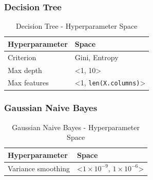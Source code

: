 \subsubsection{Decision Tree}

\begin{table}[H]
    \small
    \setlength{\tabcolsep}{8pt}
    \renewcommand{\arraystretch}{1.3}
    \centering
        \caption[Decision Tree - Hyperparameter Space]{Decision Tree - Hyperparameter Space}\label{tab:dtspace}
        \begin{tabular}{ll}
    \toprule
    \textbf{Hyperparameter} & \textbf{Space}\\
    \midrule
    \hline
    Criterion & Gini, Entropy \\
    Max depth & <1, 10> \\
    Max features & <1, \verb|len(X.columns)|>  \\
    \hline
    \bottomrule
    \end{tabular}
    \vspace{0.7em}

    \vspace{-1em}
\end{table}

\subsubsection{Gaussian Naive Bayes}

\begin{table}[H]
    \small
    \setlength{\tabcolsep}{8pt}
    \renewcommand{\arraystretch}{1.3}
    \centering
        \caption[Gaussian Naive Bayes - Hyperparameter Space]{Gaussian Naive Bayes  - Hyperparameter Space}\label{tab:gnbspace}
        \begin{tabular}{ll}
    \toprule
    \textbf{Hyperparameter} & \textbf{Space}\\
    \midrule
    \hline
    Variance smoothing & <$1\times 10^{-9}$, $1\times 10^{-6}$> \\
    \hline
    \bottomrule
    \end{tabular}
    \vspace{0.7em}

    \vspace{-1em}
\end{table}



